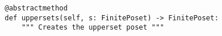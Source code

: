 \par\begin{minipage}{60ex}
\begin{verbatim}
@abstractmethod
def uppersets(self, s: FinitePoset) -> FinitePoset:
    """ Creates the upperset poset """
\end{verbatim}
\end{minipage}\par